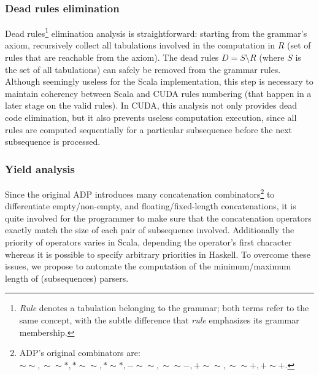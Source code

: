 \subsubsection{Dead rules elimination} \label{dead_rules}
Dead rules\footnote{\textit{Rule} denotes a tabulation belonging to the grammar; both terms refer to the same concept, with the subtle difference that \textit{rule} emphasizes its grammar membership.} elimination analysis is straightforward: starting from the grammar's axiom, recursively collect all tabulations involved in the computation in $R$ (set of rules that are reachable from the axiom). The dead rules $D=S \setminus R$ (where $S$ is the set of all tabulations) can safely be removed from the grammar rules. Although seemingly useless for the Scala implementation, this step is necessary to maintain coherency between Scala and CUDA rules numbering (that happen in a later stage on the valid rules). In CUDA, this analysis not only provides dead code elimination, but it also prevents useless computation execution, since all rules are computed sequentially for a particular subsequence before the next subsequence is processed.

\subsubsection{Yield analysis} \label{yield_analysis}
Since the original ADP introduces many concatenation combinators\footnote{ADP's original combinators are: $\sim\sim, \sim\sim*, *\sim\sim, *\sim*, -\sim\sim, \sim\sim-, +\sim\sim, \sim\sim+, +\sim+$.} to differentiate empty/non-empty, and floating/fixed-length concatenations, it is quite involved for the programmer to make sure that the concatenation operators exactly match the size of each pair of subsequence involved. Additionally the priority of operators varies in Scala, depending the operator's first character whereas it is possible to specify arbitrary priorities in Haskell. To overcome these issues, we propose to automate the computation of the minimum/maximum length of (subsequences) parsers.

